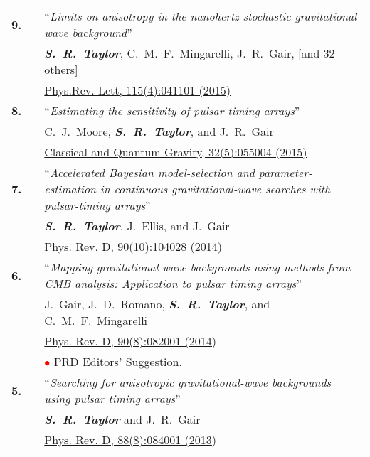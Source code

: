 \documentclass[11pt,letterpaper,sans]{moderncv}
\begin{document}
{\begin{longtable}{rp{0.3cm}p{15.8cm}}
\textbf{9.} & & ``\textit{Limits on anisotropy in the nanohertz stochastic gravitational wave background}'' \\ 
&& \textit{\textbf{S.~R.~Taylor}}, C.~M.~F.~Mingarelli, J.~R.~Gair, [and 32 others] \\ 
&& \href{http://journals.aps.org/prl/abstract/10.1103/PhysRevLett.115.041101}{{\color{color1} Phys.Rev. Lett, 115(4):041101 (2015)}} \vspace{0.09cm}\\
\textbf{8.} & & ``\textit{Estimating the sensitivity of pulsar timing arrays}'' \\ 
&& C.~J.~Moore, \textit{\textbf{S.~R.~Taylor}}, and J.~R.~Gair \\ 
&& \href{http://iopscience.iop.org/article/10.1088/0264-9381/32/5/055004/meta}{{\color{color1} Classical and Quantum Gravity, 32(5):055004 (2015)}} \vspace{0.09cm}\\
\textbf{7.} & & ``\textit{Accelerated Bayesian model-selection and parameter-estimation in continuous gravitational-wave searches with pulsar-timing arrays}'' \\ 
&& \textit{\textbf{S.~R.~Taylor}}, J.~Ellis, and J.~Gair \\ 
&& \href{http://journals.aps.org/prd/abstract/10.1103/PhysRevD.90.104028}{{\color{color1} Phys. Rev. D, 90(10):104028 (2014)}} \vspace{0.09cm}\\
\textbf{6.} & & ``\textit{Mapping gravitational-wave backgrounds using methods from CMB analysis: Application to pulsar timing arrays}'' \\ 
&& J.~Gair, J.~D.~Romano, \textit{\textbf{S.~R.~Taylor}}, and C.~M.~F.~Mingarelli \\ 
&& \href{http://journals.aps.org/prd/abstract/10.1103/PhysRevD.90.082001}{{\color{color1} Phys. Rev. D, 90(8):082001 (2014)}} \\
&& \textcolor{red}{$\bullet$} PRD Editors' Suggestion.\vspace{0.09cm}\\
\textbf{5.} & & ``\textit{Searching for anisotropic gravitational-wave backgrounds using pulsar timing arrays}'' \\ 
&& \textit{\textbf{S.~R.~Taylor}} and J.~R.~Gair \\ 
&& \href{http://journals.aps.org/prd/abstract/10.1103/PhysRevD.88.084001}{{\color{color1} Phys. Rev. D, 88(8):084001 (2013)}} \vspace{0.09cm}\\

\end{longtable}}
\end{document}
